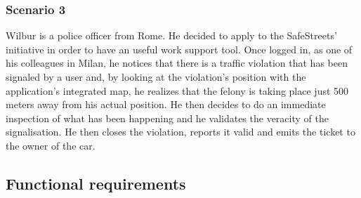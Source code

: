 \documentclass{article}
\begin{document}
\subsubsection{Scenario 3}
Wilbur is a police officer from Rome. He decided to
apply to the SafeStreets’ initiative in order to have an useful work support
tool. Once logged in, as one of his colleagues in Milan, he notices that there
is a traffic violation that has been signaled by a user and, by looking at the
violation’s position with the application’s integrated map, he realizes that the
felony is taking place just 500 meters away from his actual position. He then
decides to do an immediate inspection of what has been happening and he
validates the veracity of the signalisation. He then closes the violation,
reports it valid and emits the ticket to the owner of the car.


\newpage
\subsection{Functional requirements}
\end{document}
